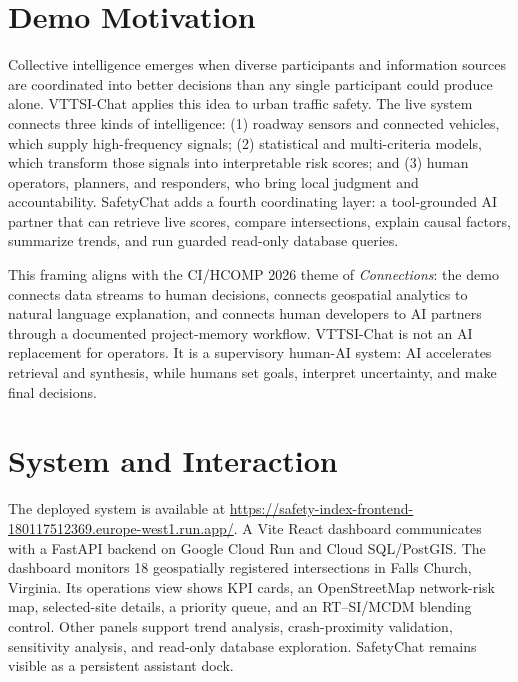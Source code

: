 \documentclass[manuscript,screen]{acmart}
\begin{document}
\maketitle

\section{Demo Motivation}

Collective intelligence emerges when diverse participants and information
sources are coordinated into better decisions than any single participant could
produce alone. VTTSI-Chat applies this idea to urban traffic safety. The live
system connects three kinds of intelligence: (1) roadway sensors and connected
vehicles, which supply high-frequency signals; (2) statistical and
multi-criteria models, which transform those signals into interpretable risk
scores; and (3) human operators, planners, and responders, who bring local
judgment and accountability. SafetyChat adds a fourth coordinating layer: a
tool-grounded AI partner that can retrieve live scores, compare intersections,
explain causal factors, summarize trends, and run guarded read-only database
queries.

This framing aligns with the CI/HCOMP 2026 theme of \emph{Connections}: the
demo connects data streams to human decisions, connects geospatial analytics
to natural language explanation, and connects human developers to AI partners
through a documented project-memory workflow. VTTSI-Chat is not an AI
replacement for operators. It is a supervisory human-AI system: AI accelerates
retrieval and synthesis, while humans set goals, interpret uncertainty, and
make final decisions.

\section{System and Interaction}

The deployed system is available at
\url{https://safety-index-frontend-180117512369.europe-west1.run.app/}. A
Vite React dashboard communicates with a FastAPI backend on Google Cloud Run
and Cloud SQL/PostGIS. The dashboard monitors 18 geospatially registered
intersections in Falls Church, Virginia. Its operations view shows KPI cards,
an OpenStreetMap network-risk map, selected-site details, a priority queue,
and an RT--SI/MCDM blending control. Other panels support trend analysis,
crash-proximity validation, sensitivity analysis, and read-only database
exploration. SafetyChat remains visible as a persistent assistant dock.
\end{document}
